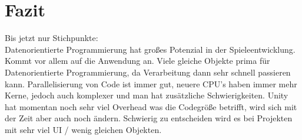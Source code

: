 \section{Fazit}
Bis jetzt nur Stichpunkte:\\
Datenorientierte Programmierung hat großes Potenzial in der Spieleentwicklung. Kommt vor allem auf die Anwendung an. Viele gleiche Objekte prima für Datenorientierte Programmierung, da Verarbeitung dann sehr schnell passieren kann. Parallelisierung von Code ist immer gut, neuere CPU's haben immer mehr Kerne, jedoch auch komplexer und man hat zusätzliche Schwierigkeiten. Unity hat momentan noch sehr viel Overhead was die Codegröße betrifft, wird sich mit der Zeit aber auch noch ändern. Schwierig zu entscheiden wird es bei Projekten mit sehr viel UI / wenig gleichen Objekten.